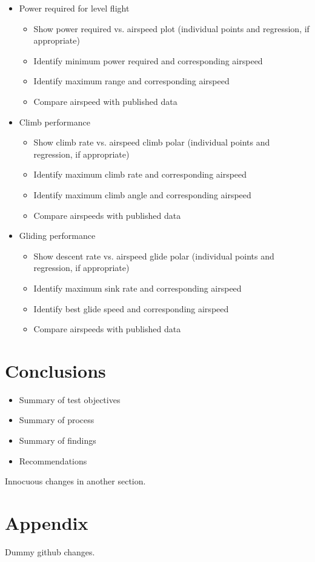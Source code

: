 \documentclass[conf]{new-aiaa}
\begin{document}
\begin{itemize}
	\item Power required for level flight
	\begin{itemize}
		\item Show power required vs. airspeed plot (individual points and regression, if appropriate)
		\item Identify minimum power required and corresponding airspeed
		\item Identify maximum range and corresponding airspeed
		\item Compare airspeed with published data
	\end{itemize}
	\item Climb performance
	\begin{itemize}
		\item Show climb rate vs. airspeed climb polar (individual points and regression, if appropriate)
		\item Identify maximum climb rate and corresponding airspeed
		\item Identify maximum climb angle and corresponding airspeed
		\item Compare airspeeds with published data
	\end{itemize}
	\item Gliding performance
	\begin{itemize}
		\item Show descent rate vs. airspeed glide polar (individual points and regression, if appropriate)
		\item Identify maximum sink rate and corresponding airspeed
		\item Identify best glide speed and corresponding airspeed
		\item Compare airspeeds with published data
	\end{itemize}
\end{itemize}

\section{Conclusions}

\begin{itemize}
	\item Summary of test objectives
	\item Summary of process
	\item Summary of findings
	\item Recommendations
\end{itemize}

Innocuous changes in another section.

\section{Appendix}

Dummy github changes.
\end{document}
